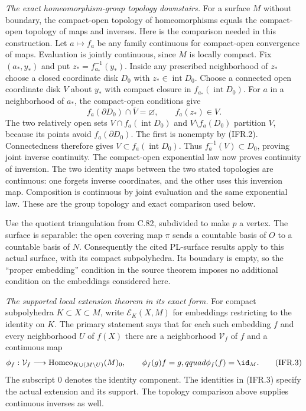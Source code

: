 \emph{The exact homeomorphism-group topology downstairs.}
For a surface $M$ without boundary, the compact-open topology of
homeomorphisms equals the compact-open topology of maps and inverses.
Here is the comparison needed in this construction. Let $a\mapsto f_a$
be any family continuous for compact-open convergence of maps.
Evaluation is jointly continuous, since $M$ is locally compact.
Fix $(a_*,y_*)$ and put $z_*=f_{a_*}^{-1}(y_*)$.
Inside any prescribed neighborhood of $z_*$ choose a closed coordinate
disk $D_0$ with $z_*\in\operatorname{int}D_0$.
Choose a connected open coordinate disk $V$ about $y_*$ with compact
closure in $f_{a_*}(\operatorname{int}D_0)$.
For $a$ in a neighborhood of $a_*$, the compact-open conditions give
\[
 f_a(\partial D_0)\cap\overline V=\varnothing,
                  \qquad f_a(z_*)\in V.                         \tag{IFR.2}
\]
The two relatively open sets
$V\cap f_a(\operatorname{int}D_0)$ and $V\setminus f_a(D_0)$
partition $V$, because its points avoid $f_a(\partial D_0)$.
The first is nonempty by (IFR.2). Connectedness therefore gives
$V\subset f_a(\operatorname{int}D_0)$.
Thus $f_a^{-1}(V)\subset D_0$, proving joint inverse continuity.
The compact-open exponential law now proves continuity of inversion.
The two identity maps between the two stated topologies are continuous:
one forgets inverse coordinates, and the other uses this inversion map.
Composition is continuous by joint evaluation and the same exponential
law. These are the group topology and exact comparison used below.

Use the quotient triangulation from C.82, subdivided to make $p$
a vertex. The surface is separable: the open covering map $\pi$
sends a countable basis of $O$ to a countable basis of $N$.
Consequently the cited PL-surface results apply to this actual
surface, with its compact subpolyhedra. Its boundary is empty,
so the ``proper embedding'' condition in the source theorem imposes
no additional condition on the embeddings considered here.

\emph{The supported local extension theorem in its exact form.}
For compact subpolyhedra $K\subset X\subset M$, write
$\mathcal E_K(X,M)$ for embeddings restricting to the identity on $K$.
The primary statement
\cite[Theorem~2.1, p.~2]{C_Yagasaki2000} says that for each such
embedding $f$ and every neighborhood $U$ of $f(X)$ there are a
neighborhood $\mathcal V_f$ of $f$ and a continuous map
\[
 \phi_f:\mathcal V_f\longrightarrow
 \operatorname{Homeo}_{K\cup(M\setminus U)}(M)_0,
 \qquad \phi_f(g)f=g,qquad \phi_f(f)=\id_M.                    \tag{IFR.3}
\]
The subscript $0$ denotes the identity component. The identities
in (IFR.3) specify the actual extension and its support. The topology
comparison above supplies continuous inverses as well.

